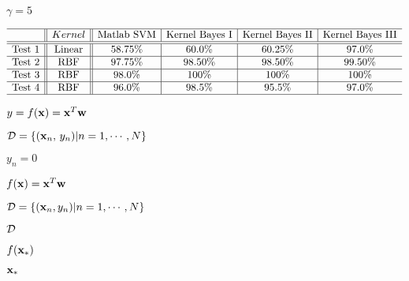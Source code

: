 \documentclass{article}
\def\lthtmlcheckvsize{\ifdim\ht\sizebox<\vsize 
  \ifdim\wd\sizebox<\hsize\expandafter\hfill\fi \expandafter\vfill
  \else\expandafter\vss\fi}%
\begin{document}
{\newpage\clearpage
{}%
$ \gamma=5$%
\lthtmlindisplaymathZ
\lthtmlcheckvsize\clearpage}

{\newpage\clearpage
{}%
\begin{displaymath}\begin{array}{l||c||c|c|c|c} \hline
& Kernel & \mbox{Matlab SVM} & \mbox{Kernel Bayes I} & \mbox{Kernel Bayes II} & \mbox{Kernel Bayes III}\\\hline\hline
\mbox{Test 1} & \mbox{Linear} & 58.75\% & 60.0\% & 60.25\% & 97.0\%\\\hline
\mbox{Test 2} & \mbox{RBF} & 97.75\% & 98.50\% & 98.50\% & 99.50\%\\\hline
\mbox{Test 3} & \mbox{RBF} & 98.0\% & 100\% & 100\% & 100\%\\\hline
\mbox{Test 4} & \mbox{RBF} & 96.0\% & 98.5\% & 95.5\% & 97.0\%\\\hline
\end{array}\end{displaymath}%
\lthtmldisplayZ
\lthtmlcheckvsize\clearpage}

{\newpage\clearpage
{}%
$ y=f({\bf x})={\bf x}^T{\bf w}$%
\lthtmlindisplaymathZ
\lthtmlcheckvsize\clearpage}

{\newpage\clearpage
{}%
$ {\cal D}=\{ ({\bf x}_n,\,y_n)|n=1,\cdots,N\}$%
\lthtmlindisplaymathZ
\lthtmlcheckvsize\clearpage}

{\newpage\clearpage
{}%
$ y_n=0$%
\lthtmlindisplaymathZ
\lthtmlcheckvsize\clearpage}

{\newpage\clearpage
{}%
$ f({\bf x})={\bf x}^T{\bf w}$%
\lthtmlindisplaymathZ
\lthtmlcheckvsize\clearpage}

{\newpage\clearpage
{}%
$ {\cal D}=\{ ({\bf x}_n,y_n)|n=1,\cdots,N\}$%
\lthtmlindisplaymathZ
\lthtmlcheckvsize\clearpage}

{\newpage\clearpage
{}%
$ {\cal D}$%
\lthtmlindisplaymathZ
\lthtmlcheckvsize\clearpage}

{\newpage\clearpage
{}%
$ f({\bf x}_*)$%
\lthtmlindisplaymathZ
\lthtmlcheckvsize\clearpage}

{\newpage\clearpage
{}%
$ {\bf x}_*$%
\lthtmlindisplaymathZ
\lthtmlcheckvsize\clearpage}
\end{document}
